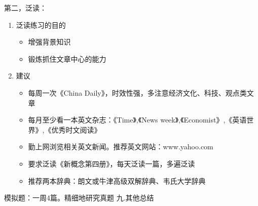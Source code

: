 \documentclass[11pt,twoside,openany,x11names,svgnames]{memoir}
\begin{document}
第二，泛读：
\begin{enumerate}
  \item 泛读练习的目的
  \begin{itemize}
  \item 增强背景知识
  \item 锻炼抓住文章中心的能力
\end{itemize}
  \item 建议
  \begin{itemize}
  \item 每周一次《China Daily》，时效性强，多注意经济文化、科技、观点类文章
  \item 每月至少看一本英文杂志：《Time》,《News week》,《Economist》,《英语世界》,《优秀时文阅读》
  \item 勤上网浏览相关英文新闻。推荐英文网站：www.yahoo.com
  \item 要求泛读《新概念第四册》，每天泛读一篇，多遍泛读
  \item 推荐两本辞典：朗文或牛津高级双解辞典、韦氏大学辞典
\end{itemize}
\end{enumerate}
模拟题：一周4篇。精细地研究真题
九.其他总结
\end{document}
